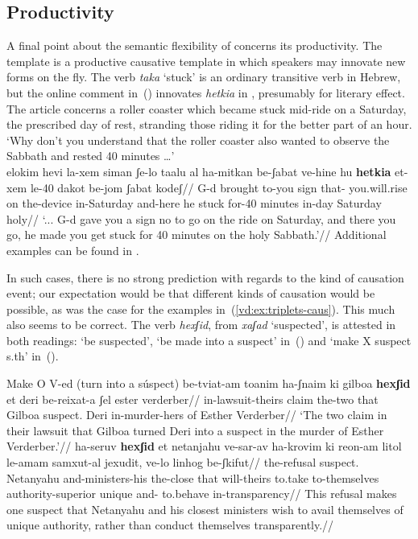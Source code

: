 	\subsection{Productivity}
A final point about the semantic flexibility of {\vd} concerns its productivity. The template {\thif} is a productive causative template \citep{lev16,kastner18tlr} in which speakers may innovate new forms on the fly. The verb \emph{taka} `stuck' is an ordinary transitive verb in Hebrew, but the online comment in~(\nextx) innovates \emph{hetkia} in {\thif}, presumably for literary effect. The article concerns a roller coaster which became stuck mid-ride on a Saturday, the prescribed day of rest, stranding those riding it for the better part of an hour.
\ex `Why don't you understand that the roller coaster also wanted to observe the Sabbath and rested 40 minutes {\dots}' \\
	\begingl
	 elokim hevi la-xem siman ʃe-lo taalu al ha-mitkan be-ʃabat ve-hine hu \textbf{hetkia} et-xem le-40 dakot be-jom ʃabat kodeʃ//
	\glb {} G-d brought to-you sign that- you.will.rise on the-device in-Saturday and-here he stuck  for-40 minutes in-day Saturday holy//
	\glft `{...} G-d gave you a sign no to go on the ride on Saturday, and there you go, he made you get stuck for 40 minutes on the holy Sabbath.'//
	\endgl	
\xe
Additional examples can be found in \cite{lev16}.

In such cases, there is no strong prediction with regards to the kind of causation event; our expectation would be that different kinds of causation would be possible, as was the case for the examples in~(\ref{vd:ex:triplets-caus}). This much also seems to be correct. The verb \emph{hexʃid}, from \emph{xaʃad} `suspected', is attested in both readings: `be suspected', `be made into a suspect' in~(\nextx) and `make X suspect s.th' in~(\anextx).

\pex Make O V-ed (turn into a súspect)
	\a \begingl
		\gla be-tviat-am toanim ha-ʃnaim ki gilboa \textbf{hexʃid} et deri be-re{\texttslig}ixat-a ʃel ester verderber//
		\glb in-lawsuit-theirs claim the-two that Gilboa suspect.  Deri in-murder-hers of Esther Verderber//
		\glft `The two claim in their lawsuit that Gilboa turned Deri into a suspect in the murder of Esther Verderber.'//
	\endgl
	\a \begingl
		\gla ha-seruv \textbf{hexʃid} et netanjahu ve-sar-av ha-krovim ki re{\texttslig}on-am litol le-a{\texttslig}mam samxut-al jexudit, ve-lo linhog be-ʃkifut//
		\glb the-refusal suspect.  Netanyahu and-ministers-his the-close that will-theirs to.take to-themselves authority-superior unique and- to.behave in-transparency//
		\glft This refusal makes one suspect that Netanyahu and his closest ministers wish to avail themselves of unique authority, rather than conduct themselves transparently.//
	\endgl
\xe
	
